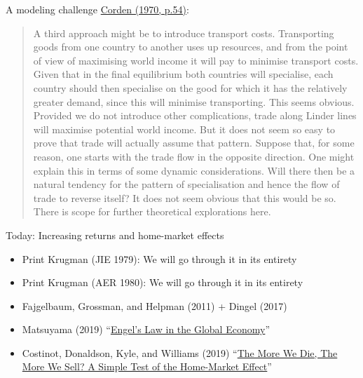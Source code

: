 \documentclass[10pt,notes=hide]{beamer}
\begin{document}
\begin{frame}{A modeling challenge}
\href{http://tradediversion.net/2013/10/11/a-prescient-note-on-the-home-market-effect-by-max-corden/}{Corden (1970, p.54)}:
\linespread{1.0}
\begin{quote}
{\small
A third approach might be to introduce transport costs. Transporting goods from one country to another uses up resources, and from the point of view of maximising world income it will pay to minimise transport costs. Given that in the final equilibrium both countries will specialise, each country should then specialise on the good for which it has the relatively greater demand, since this will minimise transporting. This seems obvious. Provided we do not introduce other complications, trade along Linder lines will maximise potential world income. But it does not seem so easy to prove that trade will actually assume that pattern. Suppose that, for some reason, one starts with the trade flow in the opposite direction. One might explain this in terms of some dynamic considerations. Will there then be a natural tendency for the pattern of specialisation and hence the flow of trade to reverse itself? It does not seem obvious that this would be so. There is scope for further theoretical explorations here.
}
\end{quote}
\end{frame}
\begin{frame}{Today: Increasing returns and home-market effects}
\begin{itemize}
\item Print Krugman (JIE 1979): We will go through it in its entirety
\item Print Krugman (AER 1980): We will go through it in its entirety
\item Fajgelbaum, Grossman, and Helpman (2011) + Dingel (2017)
\item Matsuyama (2019) ``\href{https://onlinelibrary-wiley-com.proxy.uchicago.edu/doi/10.3982/ECTA13765}{Engel's Law in the Global Economy}''
\item Costinot, Donaldson, Kyle, and Williams (2019) ``\href{https://academic.oup.com/qje/article/134/2/843/5298504}{The More We Die, The More We Sell? A Simple Test of the Home-Market Effect}''
\end{itemize}
\end{frame}
\end{document}

